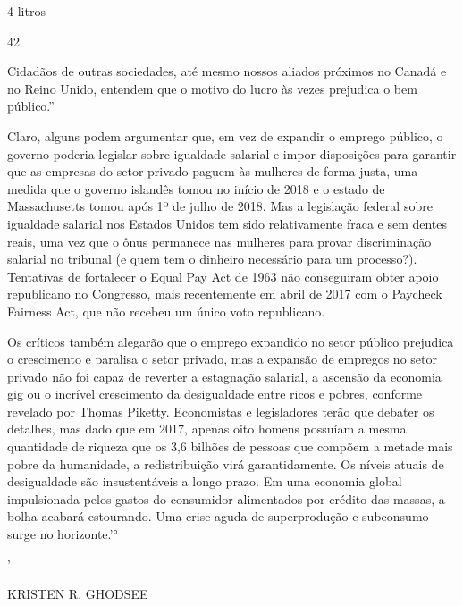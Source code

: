  \par 
4 litros
 \par 
42
 \par 
Cidadãos de outras sociedades, até mesmo nossos aliados próximos no Canadá e no Reino Unido, entendem que o motivo do lucro às vezes prejudica o bem público.”
 \par 
Claro, alguns podem argumentar que, em vez de expandir o emprego público, o governo poderia legislar sobre igualdade salarial e impor disposições para garantir que as empresas do setor privado paguem às mulheres de forma justa, uma medida que o governo islandês tomou no início de 2018 e o estado de Massachusetts tomou após 1º de julho de 2018. Mas a legislação federal sobre igualdade salarial nos Estados Unidos tem sido relativamente fraca e sem dentes reais, uma vez que o ônus permanece nas mulheres para provar discriminação salarial no tribunal (e quem tem o dinheiro necessário para um processo?). Tentativas de fortalecer o Equal Pay Act de 1963 não conseguiram obter apoio republicano no Congresso, mais recentemente em abril de 2017 com o Paycheck Fairness Act, que não recebeu um único voto republicano.
 \par 
Os críticos também alegarão que o emprego expandido no setor público prejudica o crescimento e paralisa o setor privado, mas a expansão de empregos no setor privado não foi capaz de reverter a estagnação salarial, a ascensão da economia gig ou o incrível crescimento da desigualdade entre ricos e pobres, conforme revelado por Thomas Piketty. Economistas e legisladores terão que debater os detalhes, mas dado que em 2017, apenas oito homens possuíam a mesma quantidade de riqueza que os 3,6 bilhões de pessoas que compõem a metade mais pobre da humanidade, a redistribuição virá garantidamente. Os níveis atuais de desigualdade são insustentáveis ​​a longo prazo. Em uma economia global impulsionada pelos gastos do consumidor alimentados por crédito das massas, a bolha acabará estourando. Uma crise aguda de superprodução e subconsumo surge no horizonte.'°
 \par 
'
 \par 
KRISTEN R. GHODSEE
 \par 
